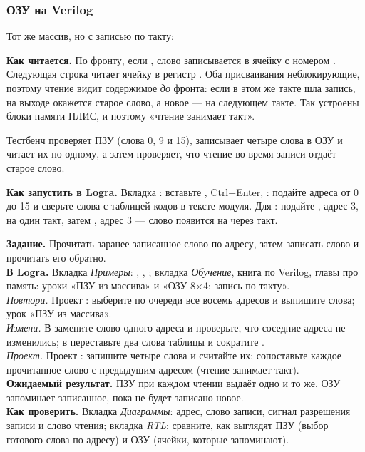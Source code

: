 \subsubsection*{ОЗУ на Verilog}

Тот же массив, но с записью по такту:


\textbf{Как читается.} По фронту, если , слово 
записывается в ячейку с номером . Следующая строка читает ячейку в
регистр . Оба присваивания неблокирующие, поэтому чтение видит
содержимое \emph{до} фронта: если в этом же такте шла запись, на выходе
окажется старое слово, а новое --- на следующем такте. Так устроены блоки
памяти ПЛИС, и поэтому «чтение занимает такт».

Тестбенч  проверяет ПЗУ (слова 0, 9 и 15), записывает четыре
слова в ОЗУ и читает их по одному, а затем проверяет, что чтение во время
записи отдаёт старое слово.

\textbf{Как запустить в Logra.} Вкладка : вставьте ,
Ctrl+Enter, : подайте адреса от 0 до 15 и сверьте слова
с таблицей кодов в тексте модуля. Для : подайте
, адрес 3,  на один такт, затем ,
адрес 3 --- слово  появится на  через такт.

\begin{diybox}
\textbf{Задание.} Прочитать заранее записанное слово по адресу, затем
записать слово и прочитать его обратно.\\
\textbf{В Logra.} Вкладка \emph{Примеры}: ,
, ; вкладка \emph{Обучение}, книга по
Verilog, главы про память: уроки «ПЗУ из массива» и «ОЗУ 8×4: запись по
такту».\\
 \emph{Повтори.} Проект : выберите по очереди все
восемь адресов и выпишите слова; урок «ПЗУ из массива».\\
 \emph{Измени.} В  замените слово одного адреса и
проверьте, что соседние адреса не изменились; в  переставьте
два слова таблицы и сократите .\\
 \emph{Проект.} Проект : запишите четыре
слова и считайте их; сопоставьте каждое прочитанное слово с предыдущим
адресом (чтение занимает такт).\\
\textbf{Ожидаемый результат.} ПЗУ при каждом чтении выдаёт одно и то же,
ОЗУ запоминает записанное, пока не будет записано новое.\\
\textbf{Как проверить.} Вкладка \emph{Диаграммы}: адрес, слово записи,
сигнал разрешения записи и слово чтения; вкладка \emph{RTL}: сравните,
как выглядят ПЗУ (выбор готового слова по адресу) и ОЗУ (ячейки, которые
запоминают).
\end{diybox}

